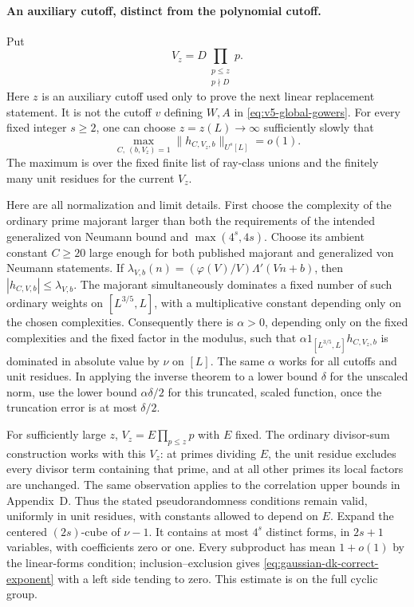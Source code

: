 \paragraph{An auxiliary cutoff, distinct from the polynomial cutoff.}
Put
\[
 V_z=D\prod_{\substack{p\leq z\\p\nmid D}}p.
\]
Here $z$ is an auxiliary cutoff used only to prove the next linear
replacement statement. It is not the cutoff $v$ defining $W,A$ in
\eqref{eq:v5-global-gowers}.
For every fixed integer $s\geq2$, one can choose $z=z(L)\to\infty$
sufficiently slowly that
\begin{equation}\label{eq:gaussian-refined-gowers}
 \max_{C,\ (b,V_z)=1}\|h_{C,V_z,b}\|_{U^s[L]}=o(1).
\end{equation}
The maximum is over the fixed finite list of ray-class unions and the
finitely many unit residues for the current $V_z$.

Here are all normalization and limit details. First choose the complexity
of the ordinary prime majorant larger than both the requirements of the
intended generalized von Neumann bound and
$\max(4^s,4s)$. Choose its ambient constant $C\geq20$ large enough for
both published majorant and generalized von Neumann statements. If
$\lambda_{V,b}(n)=(\varphi(V)/V)\Lambda'(Vn+b)$, then
$|h_{C,V,b}|\leq\lambda_{V,b}$. The majorant simultaneously dominates
a fixed number of such ordinary weights on $[L^{3/5},L]$, with a
multiplicative constant depending only on the chosen complexities.
Consequently there is $\alpha>0$, depending only on the fixed
complexities and the fixed factor in the modulus, such that
$\alpha 1_{[L^{3/5},L]}h_{C,V_z,b}$ is dominated in absolute value by
$\nu$ on $[L]$. The same $\alpha$ works for all cutoffs and unit residues.
In applying the inverse theorem to a lower bound $\delta$ for the
unscaled norm, use the lower bound $\alpha\delta/2$ for this truncated,
scaled function, once the truncation error is at most $\delta/2$.

For sufficiently large $z$, $V_z=E\prod_{p\leq z}p$ with $E$ fixed.
The ordinary divisor-sum construction works with this $V_z$: at primes
dividing $E$, the unit residue excludes every divisor term containing
that prime, and at all other primes its local factors are unchanged.
The same observation applies to the correlation upper bounds in
Appendix~D. Thus the stated pseudorandomness conditions remain valid,
uniformly in unit residues, with constants allowed to depend on $E$.
Expand the centered $(2s)$-cube of $\nu-1$. It contains at most $4^s$
distinct forms, in $2s+1$ variables, with coefficients zero or one.
Every subproduct has mean $1+o(1)$ by the linear-forms condition;
inclusion--exclusion gives \eqref{eq:gaussian-dk-correct-exponent} with
a left side tending to zero. This estimate is on the full cyclic group.

